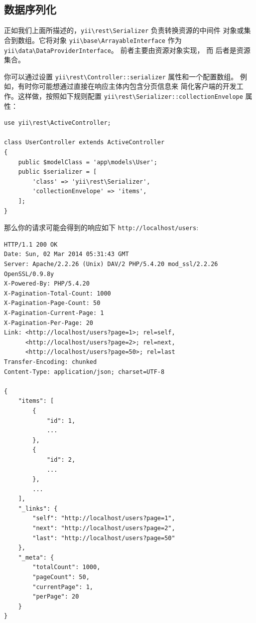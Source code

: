 \subsection{数据序列化 \label{rest-response-formatting.md::data-serializing}}
正如我们上面所描述的，\texttt{yii{\allowbreak{}\textbackslash}rest{\allowbreak{}\textbackslash}Serializer} 负责转换资源的中间件
对象或集合到数组。它将对象 \texttt{yii{\allowbreak{}\textbackslash}base{\allowbreak{}\textbackslash}ArrayableInterface} 作为
\texttt{yii{\allowbreak{}\textbackslash}data{\allowbreak{}\textbackslash}DataProviderInterface}。 前者主要由资源对象实现， 而
后者是资源集合。

你可以通过设置 \texttt{yii{\allowbreak{}\textbackslash}rest{\allowbreak{}\textbackslash}Controller\allowbreak{}::\allowbreak{}serializer} 属性和一个配置数组。
例如，有时你可能想通过直接在响应主体内包含分页信息来
简化客户端的开发工作。这样做，按照如下规则配置 \texttt{yii{\allowbreak{}\textbackslash}rest{\allowbreak{}\textbackslash}Serializer\allowbreak{}::\allowbreak{}collectionEnvelope} 
属性：

\lstset{language=php}\begin{lstlisting}
use yii\rest\ActiveController;

class UserController extends ActiveController
{
    public $modelClass = 'app\models\User';
    public $serializer = [
        'class' => 'yii\rest\Serializer',
        'collectionEnvelope' => 'items',
    ];
}
\end{lstlisting}
那么你的请求可能会得到的响应如下 \lstinline|http://localhost/users|:

\begin{lstlisting}
HTTP/1.1 200 OK
Date: Sun, 02 Mar 2014 05:31:43 GMT
Server: Apache/2.2.26 (Unix) DAV/2 PHP/5.4.20 mod_ssl/2.2.26 OpenSSL/0.9.8y
X-Powered-By: PHP/5.4.20
X-Pagination-Total-Count: 1000
X-Pagination-Page-Count: 50
X-Pagination-Current-Page: 1
X-Pagination-Per-Page: 20
Link: <http://localhost/users?page=1>; rel=self,
      <http://localhost/users?page=2>; rel=next,
      <http://localhost/users?page=50>; rel=last
Transfer-Encoding: chunked
Content-Type: application/json; charset=UTF-8

{
    "items": [
        {
            "id": 1,
            ...
        },
        {
            "id": 2,
            ...
        },
        ...
    ],
    "_links": {
        "self": "http://localhost/users?page=1",
        "next": "http://localhost/users?page=2",
        "last": "http://localhost/users?page=50"
    },
    "_meta": {
        "totalCount": 1000,
        "pageCount": 50,
        "currentPage": 1,
        "perPage": 20
    }
}
\end{lstlisting}


